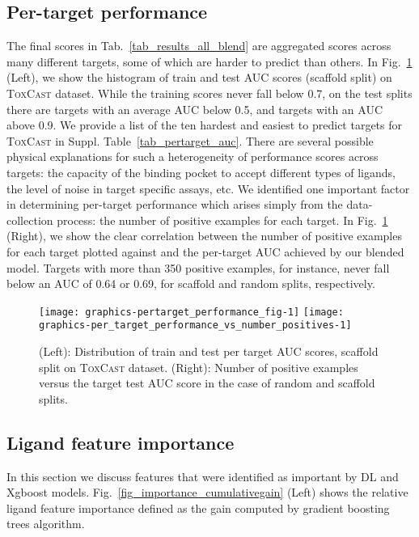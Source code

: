 \documentclass[11pt,a4paper]{article}
\begin{document}
\subsection{Per-target performance}
The final scores in Tab.~\ref{tab_results_all_blend} are aggregated scores across
many different targets, some of which are harder to predict than others.
In Fig.~\ref{fig_per_target_performance_hist} (Left), we show 
the histogram of train and test AUC scores (scaffold split) on \textsc{ToxCast} 
dataset. 
While the training scores never fall below 0.7, 
on the test splits there are targets with an average AUC below 0.5,
and targets with an AUC above 0.9. 
We provide a list of the ten hardest and easiest to predict targets for 
\textsc{ToxCast} in Suppl. Table~\ref{tab_pertarget_auc}. 
There are several possible physical explanations for such a heterogeneity of 
performance scores across targets:
the capacity of the binding pocket to accept different types
of ligands, the level of noise in target specific assays, etc. 
We identified one important factor in determining per-target performance 
which arises simply from the data-collection process: the number of 
positive examples for each target. 
In Fig.~\ref{fig_per_target_performance_hist} (Right), we show the clear correlation between the
number of positive examples for each target plotted against and 
the per-target AUC achieved by our blended model. 
Targets with more than 350 positive examples, for instance, never fall below
an AUC of 0.64 or 0.69, for scaffold and random splits, respectively.

\begin{figure}
{\centering \texttt{[image: graphics-pertarget\_performance\_fig-1]} 
 \texttt{[image: graphics-per\_target\_performance\_vs\_number\_positives-1]} 
}
  \caption{(Left): Distribution of train and test per target AUC scores, scaffold split on \textsc{ToxCast}
  dataset.  (Right):  Number of positive examples versus the target test AUC
  score in the case of random and scaffold splits.}  
\label{fig_per_target_performance_hist}
\end{figure}  


\subsection{Ligand feature importance}
In this section we discuss  features that were identified as important by DL and
Xgboost models. Fig.~\ref{fig_importance_cumulativegain} (Left) shows the relative
ligand feature importance defined as the gain computed by gradient boosting
trees algorithm. 
\end{document}
